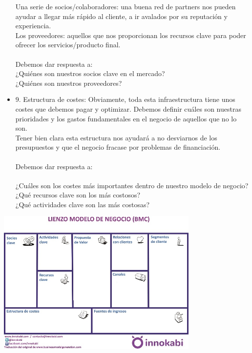 \documentclass[%
 reprint,
 amsmath,amssymb,
 aps,
]{revtex4-1}
\begin{document}
\begin{itemize}
Una serie de socios/colaboradores: una buena red de partners nos pueden ayudar a llegar más rápido al cliente, a ir avalados por su reputación y experiencia.\\
Los proveedores: aquellos que nos proporcionan los recursos clave para poder ofrecer los servicios/producto final.\\\\
Debemos dar respuesta a:\\
¿Quiénes son nuestros socios clave en el mercado?\\
¿Quiénes son nuestros proveedores?\\
\item 9. Estructura de costes: Obviamente, toda esta infraestructura tiene unos costes que debemos pagar y optimizar. Debemos definir cuáles son nuestras prioridades y los gastos fundamentales en el negocio de aquellos que no lo son.\\
Tener bien clara esta estructura nos ayudará a no desviarnos de los presupuestos y que el negocio fracase por problemas de financiación.\\\\
Debemos dar respuesta a:\\\\
¿Cuáles son los costes más importantes dentro de nuestro modelo de negocio?\\
¿Qué recursos clave son los más costosos?\\
¿Qué actividades clave son las más costosas?\\

\end{itemize}
\begin{center}
\includegraphics[width=10cm]{./Imagenes/imagen4}
\end{center}
\end{document}
